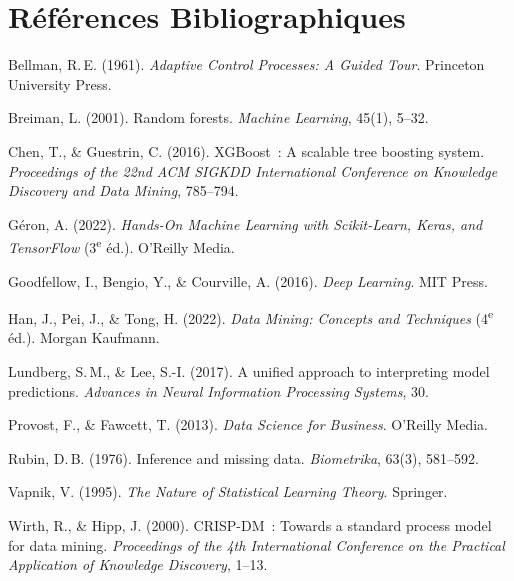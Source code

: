 \chapter*{Références Bibliographiques}

\begin{enumerate}[label={[\arabic*]}, leftmargin=1.5cm, itemsep=5pt]

  \item Bellman, R.\,E. (1961). \textit{Adaptive Control Processes: A Guided Tour}. Princeton University Press.

  \item Breiman, L. (2001). Random forests. \textit{Machine Learning}, 45(1), 5--32.

  \item Chen, T., \& Guestrin, C. (2016). XGBoost~: A scalable tree boosting system. \textit{Proceedings of the 22nd ACM SIGKDD International Conference on Knowledge Discovery and Data Mining}, 785--794.

  \item Géron, A. (2022). \textit{Hands-On Machine Learning with Scikit-Learn, Keras, and TensorFlow} (3\textsuperscript{e} éd.). O'Reilly Media.

  \item Goodfellow, I., Bengio, Y., \& Courville, A. (2016). \textit{Deep Learning}. MIT Press.

  \item Han, J., Pei, J., \& Tong, H. (2022). \textit{Data Mining: Concepts and Techniques} (4\textsuperscript{e} éd.). Morgan Kaufmann.

  \item Lundberg, S.\,M., \& Lee, S.-I. (2017). A unified approach to interpreting model predictions. \textit{Advances in Neural Information Processing Systems}, 30.

  \item Provost, F., \& Fawcett, T. (2013). \textit{Data Science for Business}. O'Reilly Media.

  \item Rubin, D.\,B. (1976). Inference and missing data. \textit{Biometrika}, 63(3), 581--592.

  \item Vapnik, V. (1995). \textit{The Nature of Statistical Learning Theory}. Springer.

  \item Wirth, R., \& Hipp, J. (2000). CRISP-DM~: Towards a standard process model for data mining. \textit{Proceedings of the 4th International Conference on the Practical Application of Knowledge Discovery}, 1--13.


\end{enumerate}
